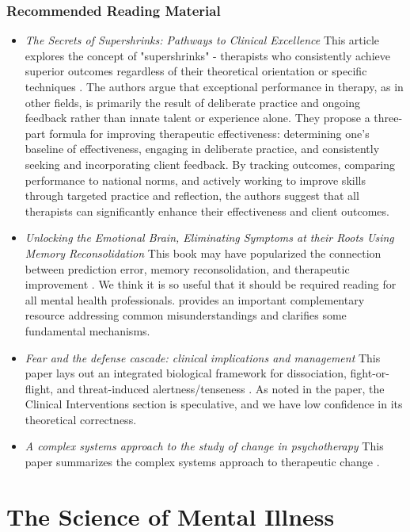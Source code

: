 \documentclass[12pt,letterpaper]{book}
\begin{document}
\subsection*{Recommended Reading Material}
\begin{itemize}
	\item \textit{The Secrets of Supershrinks: Pathways to Clinical Excellence} This article explores the concept of "supershrinks" - therapists who consistently achieve superior outcomes regardless of their theoretical orientation or specific techniques \cite{miller2014secrets}. The authors argue that exceptional performance in therapy, as in other fields, is primarily the result of deliberate practice and ongoing feedback rather than innate talent or experience alone. They propose a three-part formula for improving therapeutic effectiveness: determining one's baseline of effectiveness, engaging in deliberate practice, and consistently seeking and incorporating client feedback. By tracking outcomes, comparing performance to national norms, and actively working to improve skills through targeted practice and reflection, the authors suggest that all therapists can significantly enhance their effectiveness and client outcomes.
	\item \textit{Unlocking the Emotional Brain, Eliminating Symptoms at their Roots Using Memory Reconsolidation} This book may have popularized the connection between prediction error, memory reconsolidation, and therapeutic improvement \cite{eckerUnlocking}. We think it is so useful that it should be required reading for all mental health professionals. \textcite{ecker2015misunderstood} provides an important complementary resource addressing common misunderstandings and clarifies some fundamental mechanisms.
	\item \textit{Fear and the defense cascade: clinical implications and management} This paper lays out an integrated biological framework for dissociation, fight-or-flight, and threat-induced alertness/tenseness \cite{kozlowskaDefenseCascade}. As noted in the paper, the Clinical Interventions section is speculative, and we have low confidence in its theoretical correctness.
	\item \textit{A complex systems approach to the study of change in psychotherapy} This paper summarizes the complex systems approach to therapeutic change \cite{hayes2020complex}.
\end{itemize}
\chapter{The Science of Mental Illness}
\end{document}
